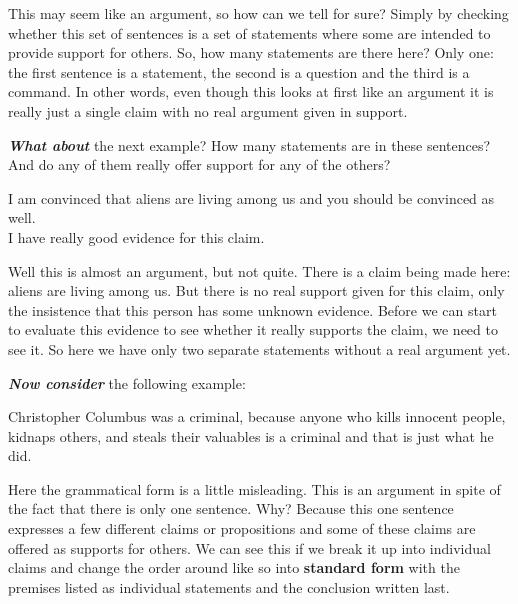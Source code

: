\documentclass[12pt, openany]{book}
\begin{document}
This may seem like an argument, so how can we tell for sure? Simply by checking whether this set of sentences is a set of statements where some are intended to provide support for others. So, how many statements are there here? Only one: the first sentence is a statement, the second is a question and the third is a command. In other words, even though this looks at first like an argument it is really just a single claim with no real argument given in support.

\textbf{\emph{What about}} the next example? How many statements are in these sentences? And do any of them really offer support for any of the others?

\begin{center}

\begin{argument}

I am convinced that aliens are living among us and you should be convinced as well.\\
I have really good evidence for this claim.

\end{argument}

\end{center}

Well this is almost an argument, but not quite. There is a claim being made here: aliens are living among us. But there is no real support given for this claim, only the insistence that this person has some unknown evidence. Before we can start to evaluate this evidence to see whether it really supports the claim, we need to see it. So here we have only two separate statements without a real argument yet.

\textbf{\emph{Now consider}} the following example:

\begin{center}

\begin{argument}

Christopher Columbus was a criminal, because anyone who kills innocent people, kidnaps others, and steals their valuables is a criminal and that is just what he did.

\end{argument}

\end{center}

Here the grammatical form is a little misleading. This is an argument in spite of the fact that there is only one sentence. Why? Because this one sentence expresses a few different claims or propositions and some of these claims are offered as supports for others. We can see this if we break it up into individual claims and change the order around like so into \textbf{standard form} with the premises listed as individual statements and the conclusion written last.
\end{document}
